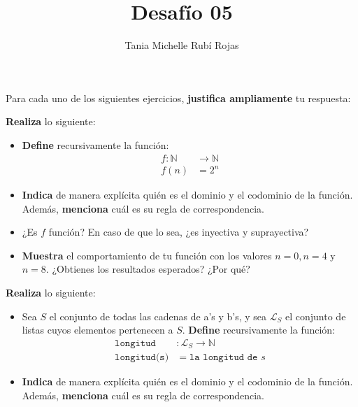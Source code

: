 \documentclass[oneside]{style}
\title{Desafío 05}
\author{Tania Michelle Rubí Rojas}
\begin{document}
\maketitle

Para cada uno de los siguientes ejercicios, \textbf{justifica ampliamente} tu 
respuesta:

\begin{questions}[label=\protect\circled{\bfseries\arabic*}]
    \question
    {
        \textbf{Realiza} lo siguiente:
        \begin{itemize}
            \item \textbf{Define} recursivamente la función: 
            \begin{align*}
                f: \mathbb{N} &\rightarrow \mathbb{N} \\ 
                f(n) &= 2^n
            \end{align*} 

            \item \textbf{Indica} de manera explícita quién es el dominio y el 
            codominio de la función. Además, \textbf{menciona} cuál es su regla 
            de correspondencia.

            \item ¿Es $f$ función? En caso de que lo sea, ¿es inyectiva y 
            suprayectiva?

            \item \textbf{Muestra} el comportamiento de tu función con los 
            valores $n = 0, n = 4$ y $n = 8$. ¿Obtienes los resultados esperados?
            ¿Por qué?
        \end{itemize}
    }

    \question
    {
        \textbf{Realiza} lo siguiente:
        \begin{itemize}
            \item Sea $S$ el conjunto de todas las cadenas de a's y b's, y sea 
            $\mathcal{L}_S$ el conjunto de listas cuyos elementos pertenecen a 
            $S$. \textbf{Define} recursivamente la función:
            \begin{align*}
                \texttt{longitud}&: \mathcal{L}_S \rightarrow \mathbb{N} \\ 
                \texttt{longitud(s)} &= \texttt{la longitud de } s 
            \end{align*}

            \item \textbf{Indica} de manera explícita quién es el dominio y el 
            codominio de la función. Además, \textbf{menciona} cuál es su regla 
            de correspondencia.


\end{itemize}}
\end{questions}
\end{document}
